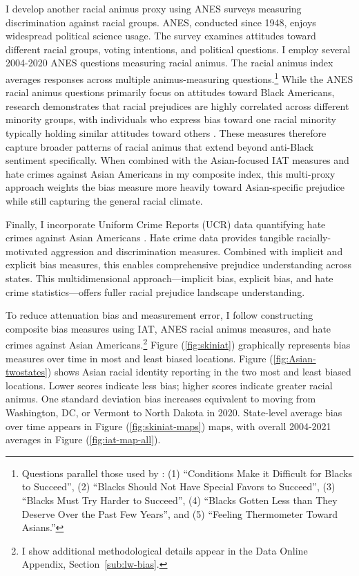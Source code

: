 I develop another racial animus proxy using ANES surveys \autocite{anes2021} measuring discrimination against racial groups. ANES, conducted since 1948, enjoys widespread political science usage. The survey examines attitudes toward different racial groups, voting intentions, and political questions. I employ several 2004-2020 ANES questions measuring racial animus. The racial animus index averages responses across multiple animus-measuring questions.\footnote{Questions parallel those used by \textcite{charlesPrejudiceWagesEmpirical2008}: (1) ``Conditions Make it Difficult for Blacks to Succeed'', (2) ``Blacks Should Not Have Special Favors to Succeed'', (3) ``Blacks Must Try Harder to Succeed'', (4) ``Blacks Gotten Less than They Deserve Over the Past Few Years'', and (5) ``Feeling Thermometer Toward Asians.''} While the ANES racial animus questions primarily focus on attitudes toward Black Americans, research demonstrates that racial prejudices are highly correlated across different minority groups, with individuals who express bias toward one racial minority typically holding similar attitudes toward others \autocite{almasalkhi2023links, mora2020antiblackness}. These measures therefore capture broader patterns of racial animus that extend beyond anti-Black sentiment specifically. When combined with the Asian-focused IAT measures and hate crimes against Asian Americans in my composite index, this multi-proxy approach weights the bias measure more heavily toward Asian-specific prejudice while still capturing the general racial climate.

Finally, I incorporate Uniform Crime Reports (UCR) data quantifying hate crimes against Asian Americans \autocite{ucrbook}. Hate crime data provides tangible racially-motivated aggression and discrimination measures. Combined with implicit and explicit bias measures, this enables comprehensive prejudice understanding across states. This multidimensional approach—implicit bias, explicit bias, and hate crime statistics—offers fuller racial prejudice landscape understanding.

To reduce attenuation bias and measurement error, I follow \textcite{lubotskyInterpretationRegressionsMultiple2006} constructing composite bias measures using IAT, ANES racial animus measures, and hate crimes against Asian Americans.\footnote{I show additional methodological details appear in the Data Online Appendix, Section~\ref{sub:lw-bias}.} Figure (\ref{fig:skiniat}) graphically represents bias measures over time in most and least biased locations. Figure (\ref{fig:Asian-twostates}) shows Asian racial identity reporting in the two most and least biased locations. Lower scores indicate less bias; higher scores indicate greater racial animus. One standard deviation bias increases equivalent to moving from Washington, DC, or Vermont to North Dakota in 2020. State-level average bias over time appears in Figure (\ref{fig:skiniat-maps}) maps, with overall 2004-2021 averages in Figure (\ref{fig:iat-map-all}).

